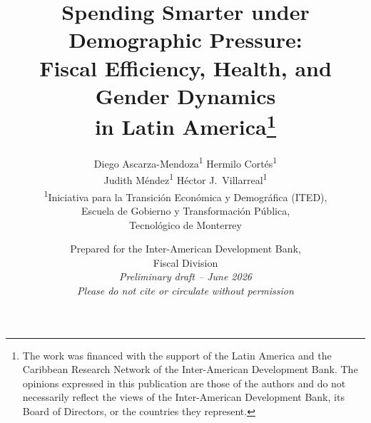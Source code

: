 \documentclass[12pt,a4paper]{article}
\begin{document}
\title{\textbf{Spending Smarter under Demographic Pressure:}\\[6pt]
Fiscal Efficiency, Health, and Gender Dynamics\\
in Latin America\thanks{The work was financed with the support of the Latin America and the Caribbean Research Network of the Inter-American Development Bank. The opinions expressed in this publication are those of the authors and do not necessarily reflect the views of the Inter-American Development Bank, its Board of Directors, or the countries they represent.}}

\author{
Diego Ascarza-Mendoza\textsuperscript{1} \quad Hermilo Cort\'es\textsuperscript{1}\\[3pt]
Judith M\'endez\textsuperscript{1} \quad H\'ector J.\ Villarreal\textsuperscript{1}
\\[6pt]
\textsuperscript{1}Iniciativa para la Transici\'on Econ\'omica y Demogr\'afica (ITED),\\
Escuela de Gobierno y Transformaci\'on P\'ublica,\\
Tecnol\'ogico de Monterrey
}

\date{%
Prepared for the Inter-American Development Bank,\\
Fiscal Division\\[12pt]
\textit{Preliminary draft -- June 2026}\\
\textit{Please do not cite or circulate without permission}
}

\maketitle
\end{document}

